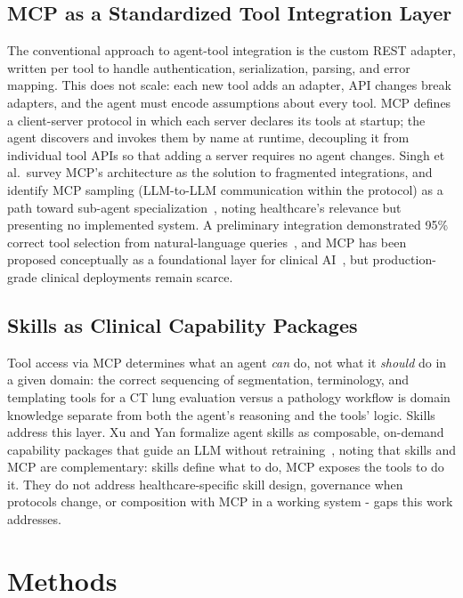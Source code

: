 \documentclass[preprint,12pt]{elsarticle}
\begin{document}
\subsection{MCP as a Standardized Tool Integration Layer}
The conventional approach to agent-tool integration is the custom REST adapter, written per tool to handle authentication, serialization, parsing, and error mapping. This does not scale: each new tool adds an adapter, API changes break adapters, and the agent must encode assumptions about every tool. MCP defines a client-server protocol in which each server declares its tools at startup; the agent discovers and invokes them by name at runtime, decoupling it from individual tool APIs so that adding a server requires no agent changes. Singh et al.\ survey MCP's architecture as the solution to fragmented integrations, and identify MCP sampling (LLM-to-LLM communication within the protocol) as a path toward sub-agent specialization~\cite{mcp-aditi}, noting healthcare's relevance but presenting no implemented system. A preliminary integration demonstrated 95\% correct tool selection from natural-language queries~\cite{mcphosts2025}, and MCP has been proposed conceptually as a foundational layer for clinical AI~\cite{transformingclinical2026}, but production-grade clinical deployments remain scarce.

\subsection{Skills as Clinical Capability Packages}
Tool access via MCP determines what an agent \emph{can} do, not what it \emph{should} do in a given domain: the correct sequencing of segmentation, terminology, and templating tools for a CT lung evaluation versus a pathology workflow is domain knowledge separate from both the agent's reasoning and the tools' logic. Skills address this layer. Xu and Yan formalize agent skills as composable, on-demand capability packages that guide an LLM without retraining~\cite{agentskillslargelanguage}, noting that skills and MCP are complementary: skills define what to do, MCP exposes the tools to do it. They do not address healthcare-specific skill design, governance when protocols change, or composition with MCP in a working system - gaps this work addresses.

\section{Methods}
\end{document}
